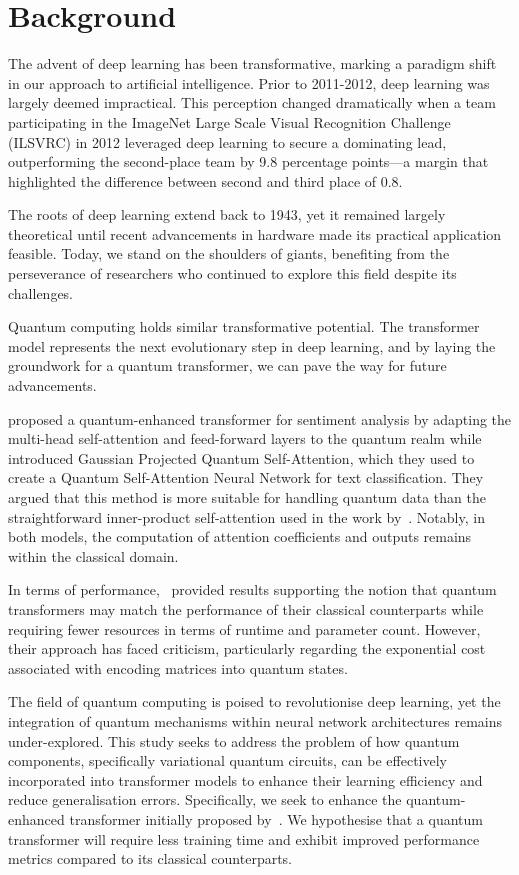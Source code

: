 \section{Background}
\label{sec:proposal_background}
The advent of deep learning has been transformative, marking a
paradigm shift in our approach to artificial intelligence. Prior to
2011-2012, deep learning was largely deemed impractical. This
perception changed dramatically when a team participating in the
ImageNet Large Scale Visual Recognition Challenge (ILSVRC) in 2012
leveraged deep learning to secure a dominating lead, outperforming
the second-place team by 9.8 percentage points—a margin that
highlighted the difference between second and third place of 0.8.

The roots of deep learning extend back to 1943, yet it remained
largely theoretical until recent advancements in hardware made its
practical application feasible. Today, we stand on the shoulders of
giants, benefiting from the perseverance of researchers who continued
to explore this field despite its challenges.

Quantum computing holds similar transformative potential. The
transformer model represents the next evolutionary step in deep
learning, and by laying the groundwork for a quantum transformer, we
can pave the way for future advancements.

\citet{disipio2021dawn} proposed a quantum-enhanced transformer for
sentiment analysis by adapting the multi-head self-attention and
feed-forward layers to the quantum realm while~\citet{li2023quantum}
introduced Gaussian Projected Quantum Self-Attention, which they used
to create a Quantum Self-Attention Neural Network for text
classification. They argued that this method is more suitable for
handling quantum data than the straightforward inner-product
self-attention used in the work by~\citet{disipio2021dawn}. Notably,
in both models, the computation of attention coefficients and outputs
remains within the classical domain.

In terms of performance,~\citet{Cherrat_2024} provided results
supporting the notion that quantum transformers may match the
performance of their classical counterparts while requiring fewer
resources in terms of runtime and parameter count. However, their
approach has faced criticism, particularly regarding the exponential
cost associated with encoding matrices into quantum states.

The field of quantum computing is poised to revolutionise deep
learning, yet the integration of quantum mechanisms within neural
network architectures remains under-explored. This study seeks to
address the problem of how quantum components, specifically
variational quantum circuits, can be effectively incorporated into
transformer models to enhance their learning efficiency and reduce
generalisation errors. Specifically, we seek to enhance the
quantum-enhanced transformer initially proposed
by~\citet{disipio2021dawn}. We hypothesise that a quantum transformer
will require less training time and exhibit improved performance
metrics compared to its classical counterparts.

